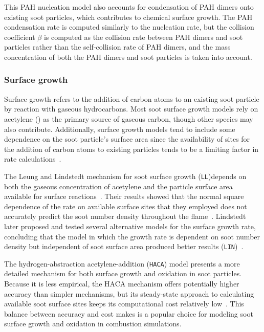 \documentclass[preprint,letterpaper]{elsarticle}
\begin{document}
This PAH nucleation model also accounts for condensation of PAH dimers onto existing soot particles, which contributes to chemical surface growth.
The PAH condensation rate is computed similarly to the nucleation rate, but the collision coefficient $\beta$ is computed as the collision rate between PAH dimers and soot particles rather than the self-collision rate of PAH dimers, and the mass concentration of both the PAH dimers and soot particles is taken into account.

\subsubsection{Surface growth}
\label{s:grw}

Surface growth refers to the addition of carbon atoms to an existing soot particle by reaction with gaseous hydrocarbons. Most soot surface growth models rely on acetylene () as the primary source of gaseous carbon, though other species may also contribute. Additionally, surface growth models tend to include some dependence on the soot particle's surface area since the availability of sites for the addition of carbon atoms to existing particles tends to be a limiting factor in rate calculations~\cite{Wang_2011}.

The Leung and Lindstedt mechanism for soot surface growth (\texttt{LL})depends on both the gaseous concentration of acetylene and the particle surface area available for surface reactions~\cite{Leung_1991}. Their results showed that the normal square dependence of the rate on available surface sites that they employed does not accurately predict the soot number density throughout the flame~\cite{Leung_1991}. Lindstedt later proposed and tested several alternative models for the surface growth rate, concluding that the model in which the growth rate is dependent on soot number density but independent of soot surface area produced better results (\texttt{LIN})~\cite{Lindstedt_1994}.

The hydrogen-abstraction acetylene-addition (\texttt{HACA}) model presents a more detailed mechanism for both surface growth and oxidation in soot particles. Because it is less empirical, the HACA mechanism offers potentially higher accuracy than simpler mechanisms, but its steady-state approach to calculating available soot surface sites keeps its computational cost relatively low~\cite{Appel_2000}. This balance between accuracy and cost makes is a popular choice for modeling soot surface growth and oxidation in combustion simulations.
\end{document}
